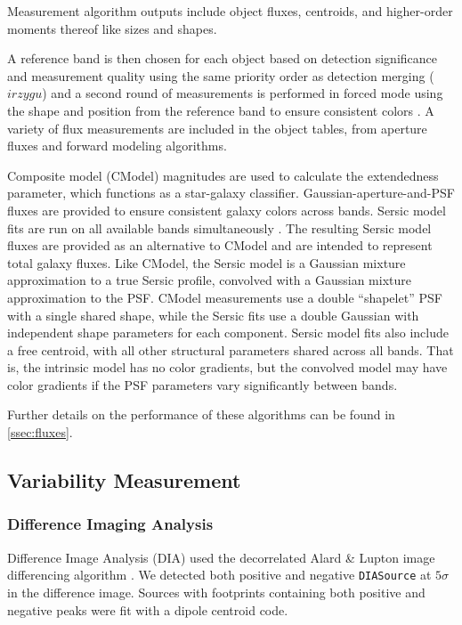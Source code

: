 Measurement \gls{algorithm} outputs include object fluxes, centroids, and higher-order moments thereof like sizes and shapes.

A reference band is then chosen for each object based on detection significance and measurement quality using the same priority order as detection merging ($irzygu$) and a second round of measurements is performed in forced mode using the shape and position from the reference band to ensure consistent colors \citep{2018PASJ...70S...5B}.
A variety of \gls{flux} measurements are included in the object tables, from aperture fluxes and forward modeling algorithms.

Composite model (CModel) magnitudes are used to calculate the extendedness parameter, which functions as a star-galaxy classifier.
Gaussian-aperture-and-PSF \citep[GAaP][]{2008A&A...482.1053K, DMTN-190} fluxes are provided to ensure consistent galaxy colors across bands.
Sersic model fits are run on all available bands simultaneously \cite[MultiProFit][]{dmtn-312}.
The resulting Sersic \citep{1963BAAA....6...41S, 1968adga.book.....S} model fluxes are provided as an alternative to CModel and are intended to represent total galaxy fluxes.
Like CModel, the Sersic model is a Gaussian mixture approximation to a true Sersic profile, convolved with a Gaussian mixture approximation to the \gls{PSF}.
CModel measurements use a double ``shapelet'' \citep{2003ARA&A..41..645R} PSF with a single shared shape, while the Sersic fits use a double Gaussian with independent shape parameters for each component.
Sersic model fits also include a free centroid, with all other structural parameters shared across all bands.
That is, the intrinsic model has no color gradients, but the convolved model may have color gradients if the \gls{PSF} parameters vary significantly between bands.

Further details on the performance of these algorithms can be found in \ref{ssec:fluxes}.

\subsection{Variability Measurement}

\subsubsection{Difference Imaging Analysis
\label{ssec:difim_analysis}}
Difference Image Analysis (DIA) used the decorrelated Alard \& Lupton image differencing algorithm \citep{DMTN-021}.
We detected both positive and negative \texttt{DIASource} at $5\sigma$ in the difference image.
Sources with footprints containing both positive and negative peaks were fit with a dipole centroid code.

